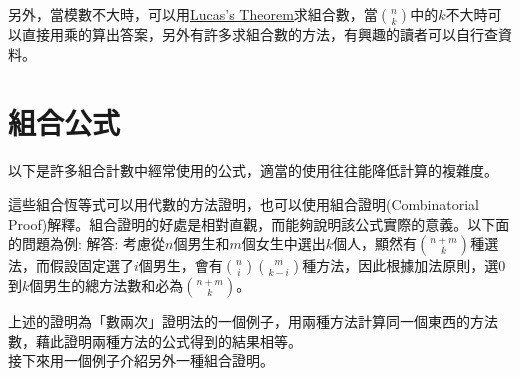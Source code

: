另外，當模數不大時，可以用\href{https://en.wikipedia.org/wiki/Lucas\%27s_theorem}{Lucas's Theorem}求組合數，當$\binom{n}{k}$中的$k$不大時可以直接用乘的算出答案，另外有許多求組合數的方法，有興趣的讀者可以自行查資料。

\section{組合公式}
以下是許多組合計數中經常使用的公式，適當的使用往往能降低計算的複雜度。

這些組合恆等式可以用代數的方法證明，也可以使用組合證明(Combinatorial Proof)解釋。組合證明的好處是相對直觀，而能夠說明該公式實際的意義。以下面的問題為例:
解答: 考慮從$n$個男生和$m$個女生中選出$k$個人，顯然有$\binom{n+m}{k}$種選法，而假設固定選了$i$個男生，會有$\binom{n}{i}\binom{m}{k-i}$種方法，因此根據加法原則，選$0$到$k$個男生的總方法數和必為$\binom{n+m}{k}$。
\par 上述的證明為「數兩次」證明法的一個例子，用兩種方法計算同一個東西的方法數，藉此證明兩種方法的公式得到的結果相等。\\
接下來用一個例子介紹另外一種組合證明。

